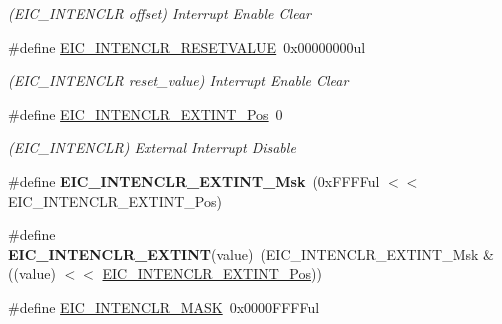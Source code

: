 \begin{DoxyCompactItemize}
\begin{DoxyCompactList}\small\item\em (E\+I\+C\+\_\+\+I\+N\+T\+E\+N\+C\+L\+R offset) Interrupt Enable Clear \end{DoxyCompactList}\item 
\hypertarget{group___s_a_m_l21___e_i_c_gaa93fcdad643eb338a3f20268b85555f9}{}\#define \hyperlink{group___s_a_m_l21___e_i_c_gaa93fcdad643eb338a3f20268b85555f9}{E\+I\+C\+\_\+\+I\+N\+T\+E\+N\+C\+L\+R\+\_\+\+R\+E\+S\+E\+T\+V\+A\+L\+U\+E}~0x00000000ul\label{group___s_a_m_l21___e_i_c_gaa93fcdad643eb338a3f20268b85555f9}

\begin{DoxyCompactList}\small\item\em (E\+I\+C\+\_\+\+I\+N\+T\+E\+N\+C\+L\+R reset\+\_\+value) Interrupt Enable Clear \end{DoxyCompactList}\item 
\hypertarget{group___s_a_m_l21___e_i_c_ga741348eb720fbcd5a997515060a08f79}{}\#define \hyperlink{group___s_a_m_l21___e_i_c_ga741348eb720fbcd5a997515060a08f79}{E\+I\+C\+\_\+\+I\+N\+T\+E\+N\+C\+L\+R\+\_\+\+E\+X\+T\+I\+N\+T\+\_\+\+Pos}~0\label{group___s_a_m_l21___e_i_c_ga741348eb720fbcd5a997515060a08f79}

\begin{DoxyCompactList}\small\item\em (E\+I\+C\+\_\+\+I\+N\+T\+E\+N\+C\+L\+R) External Interrupt Disable \end{DoxyCompactList}\item 
\hypertarget{group___s_a_m_l21___e_i_c_ga5ff4b9c6c227cf5c2af5b9ab1ba1e358}{}\#define {\bfseries E\+I\+C\+\_\+\+I\+N\+T\+E\+N\+C\+L\+R\+\_\+\+E\+X\+T\+I\+N\+T\+\_\+\+Msk}~(0x\+F\+F\+F\+Ful $<$$<$ E\+I\+C\+\_\+\+I\+N\+T\+E\+N\+C\+L\+R\+\_\+\+E\+X\+T\+I\+N\+T\+\_\+\+Pos)\label{group___s_a_m_l21___e_i_c_ga5ff4b9c6c227cf5c2af5b9ab1ba1e358}

\item 
\hypertarget{group___s_a_m_l21___e_i_c_gace82ce29ec0f78de7cd95a1bfbcc4600}{}\#define {\bfseries E\+I\+C\+\_\+\+I\+N\+T\+E\+N\+C\+L\+R\+\_\+\+E\+X\+T\+I\+N\+T}(value)~(E\+I\+C\+\_\+\+I\+N\+T\+E\+N\+C\+L\+R\+\_\+\+E\+X\+T\+I\+N\+T\+\_\+\+Msk \& ((value) $<$$<$ \hyperlink{group___s_a_m_l21___e_i_c_ga741348eb720fbcd5a997515060a08f79}{E\+I\+C\+\_\+\+I\+N\+T\+E\+N\+C\+L\+R\+\_\+\+E\+X\+T\+I\+N\+T\+\_\+\+Pos}))\label{group___s_a_m_l21___e_i_c_gace82ce29ec0f78de7cd95a1bfbcc4600}

\item 
\hypertarget{group___s_a_m_l21___e_i_c_gac121def07c8b3d84e3d58470fa7e0a2a}{}\#define \hyperlink{group___s_a_m_l21___e_i_c_gac121def07c8b3d84e3d58470fa7e0a2a}{E\+I\+C\+\_\+\+I\+N\+T\+E\+N\+C\+L\+R\+\_\+\+M\+A\+S\+K}~0x0000\+F\+F\+F\+Ful\label{group___s_a_m_l21___e_i_c_gac121def07c8b3d84e3d58470fa7e0a2a}


\end{DoxyCompactItemize}

